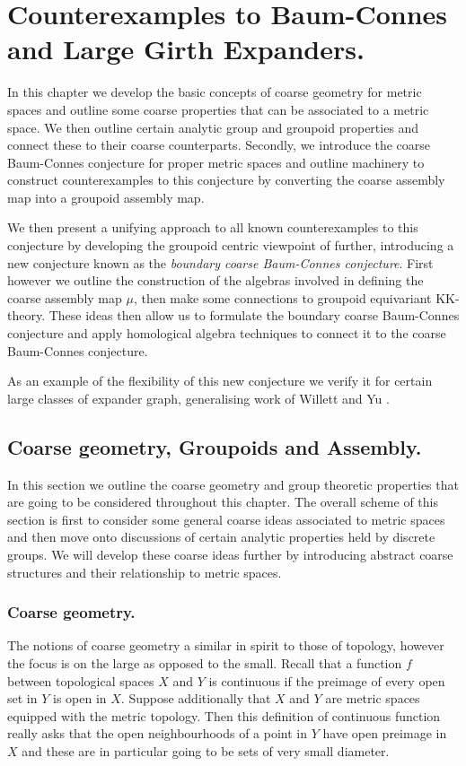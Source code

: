 \chapter{Counterexamples to Baum-Connes and Large Girth Expanders.}
In this chapter we develop the basic concepts of coarse geometry for metric spaces and outline some coarse properties that can be associated to a metric space. We then outline certain analytic group and groupoid properties and connect these to their coarse counterparts. Secondly, we introduce the coarse Baum-Connes conjecture for proper metric spaces and outline machinery to construct counterexamples to this conjecture by converting the coarse assembly map into a groupoid assembly map.

We then present a unifying approach to all known counterexamples to this conjecture by developing the groupoid centric viewpoint of \cite{MR1911663} further, introducing a new conjecture known as the \textit{boundary coarse Baum-Connes conjecture}. First however we outline the construction of the algebras involved in defining the coarse assembly map $\mu$, then make some connections to groupoid equivariant KK-theory. These ideas then allow us to formulate the boundary coarse Baum-Connes conjecture and apply homological algebra techniques to connect it to the coarse Baum-Connes conjecture.

As an example of the flexibility of this new conjecture we verify it for certain large classes of expander graph, generalising work of Willett and Yu \cite{explg1}.

\section{Coarse geometry, Groupoids and Assembly.}
In this section we outline the coarse geometry and group theoretic properties that are going to be considered throughout this chapter. The overall scheme of this section is first to consider some general coarse ideas associated to metric spaces and then move onto discussions of certain analytic properties held by discrete groups. We will develop these coarse ideas further by introducing abstract coarse structures and their relationship to metric spaces.

\subsection{Coarse geometry.}
The notions of coarse geometry a similar in spirit to those of topology, however the focus is on the large as opposed to the small. Recall that a function $f$ between topological spaces $X$ and $Y$ is continuous if the preimage of every open set in $Y$ is open in $X$. Suppose additionally that $X$ and $Y$ are metric spaces equipped with the metric topology. Then this definition of continuous function really asks that the open neighbourhoods of a point in $Y$ have open preimage in $X$ and these are in particular going to be sets of very small diameter. 


